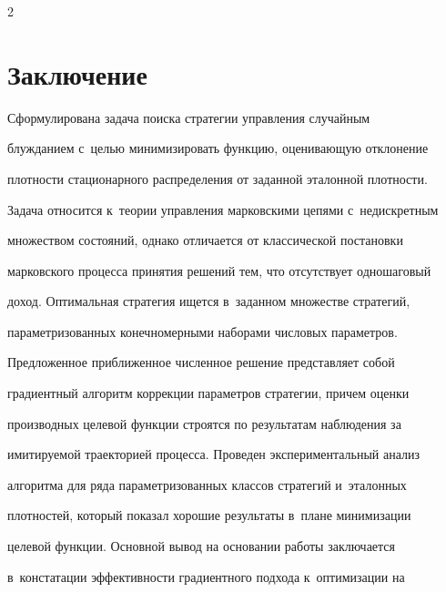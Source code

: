 \begin{multicols}{2}





\section{Заключение}


  


  Сформулирована задача поиска стратегии управ\-ле\-ния случайным 


блужданием с~целью минимизировать функцию, оценивающую отклонение 


плотности стационарного распределения от заданной эталонной плот\-ности.


Задача относится к~теории управ\-ле\-ния марковскими цепями с~недискретным 


множеством со\-сто\-яний, однако отличается от классической постановки 


марковского процесса принятия решений тем, что отсутствует одношаговый 


доход. Оптимальная стратегия ищется в~заданном множестве стратегий, 


параметризованных конечномерными наборами чис\-ло\-вых па\-ра\-мет\-ров.


{





} 





Предложенное при\-бли\-жен\-ное чис\-лен\-ное решение пред\-став\-ля\-ет собой 


градиентный алгоритм коррекции па\-ра\-мет\-ров стратегии, причем оценки\linebreak 


производных целевой функции строятся по результатам наблюдения за 


имитируемой траекторией процесса. Проведен экспериментальный анализ 


алгоритма для ряда па\-ра\-мет\-ри\-зо\-ван\-ных классов стратегий и~эталонных 


плотностей, который показал хорошие результаты в~плане минимизации 


целевой функции. Основной вывод на основании работы за\-клю\-ча\-ет\-ся 


в~констатации эффективности градиентного подхода к~оптимизации на 



\end{multicols}
